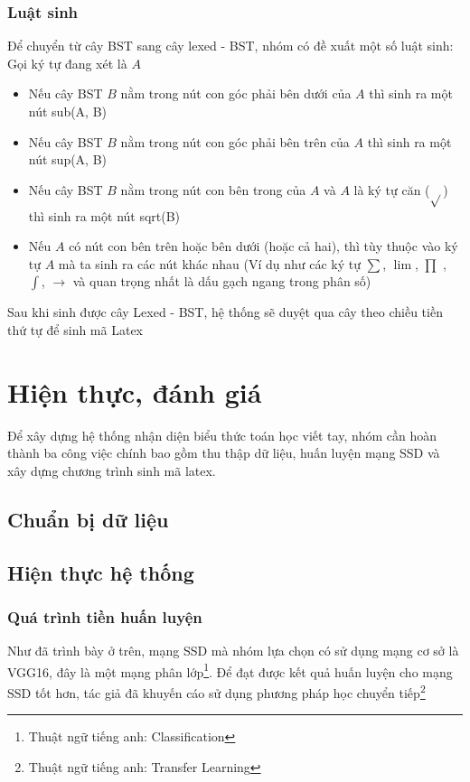 \documentclass[a4paper,12pt]{article}
\begin{document}
	\subsubsection*{Luật sinh}
	
	
	Để chuyển từ cây BST sang cây lexed - BST, nhóm có đề xuất một số luật sinh: \\
	Gọi ký tự đang xét là $A$
	\begin{itemize}
		\item Nếu cây BST $B$ nằm trong nút con góc phải bên dưới của $A$ thì sinh ra một nút sub(A, B)
		\item Nếu cây BST $B$ nằm trong nút con góc phải bên trên của $A$ thì sinh ra một nút sup(A, B)
		\item Nếu cây BST $B$ nằm trong nút con bên trong của $A$ và $A$ là ký tự căn ($\sqrt{}$) thì sinh ra một nút sqrt(B)
		\item Nếu $A$ có nút con bên trên hoặc bên dưới (hoặc cả hai), thì tùy thuộc vào ký tự $A$ mà ta sinh ra các nút khác nhau (Ví dụ như các ký tự $\sum$, $\lim$, $\prod$ , $\int$, $\rightarrow$ và quan trọng nhất là dấu gạch ngang trong phân số)
		
	\end{itemize}
	
	Sau khi sinh được cây Lexed - BST, hệ thống sẽ duyệt qua cây theo chiều tiền thứ tự để sinh mã Latex
	
	
	\section{Hiện thực, đánh giá}
	
	Để xây dựng hệ thống nhận diện biểu thức toán học viết tay, nhóm cần hoàn thành ba công việc chính bao gồm thu thập dữ liệu, huấn luyện mạng SSD và xây dựng chương trình sinh mã latex.
	
	\subsection{Chuẩn bị dữ liệu}
	
	\subsection{Hiện thực hệ thống}
	
	\subsubsection{Quá trình tiền huấn luyện}
	Như đã trình bày ở trên, mạng SSD mà nhóm lựa chọn có sử dụng mạng cơ sở là VGG16, đây là một mạng phân lớp\footnote{Thuật ngữ tiếng anh: Classification}. Để đạt được kết quả huấn luyện cho mạng SSD tốt hơn, tác giả đã khuyến cáo sử dụng phương pháp học chuyển tiếp\footnote{Thuật ngữ tiếng anh: Transfer Learning}
	
\end{document}
